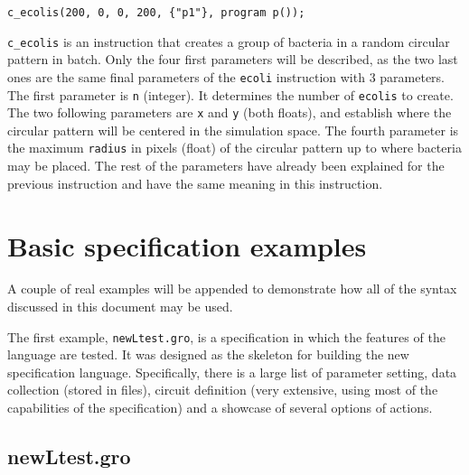 \documentclass[10pt,a4paper]{article}
\begin{document}
\begin{Verbatim}[obeytabs]
c_ecolis(200, 0, 0, 200, {"p1"}, program p());
\end{Verbatim}

\texttt{c\_ecolis} is an instruction that creates a group of bacteria in a random circular pattern in batch. Only the four first parameters will be described, as the two last ones are the same final parameters of the \texttt{ecoli} instruction with 3 parameters. The first parameter is \texttt{n} (integer). It determines the number of \texttt{ecolis} to create. The two following parameters are \texttt{x} and \texttt{y} (both floats), and establish where the circular pattern will be centered in the simulation space. The fourth parameter is the maximum \texttt{radius} in pixels (float) of the circular pattern up to where bacteria may be placed. The rest of the parameters have already been explained for the previous instruction and have the same meaning in this instruction. \newpage

\section{Basic specification examples}
A couple of real examples will be appended to demonstrate how all of the syntax discussed in this document may be used. \newline

The first example, \texttt{newLtest.gro}, is a specification in which the features of the language are tested. It was designed as the skeleton for building the new specification language. Specifically, there is a large list of parameter setting, data collection (stored in files), circuit definition (very extensive, using most of the capabilities of the specification) and a showcase of several options of actions.

\subsection{newLtest.gro}
\end{document}
